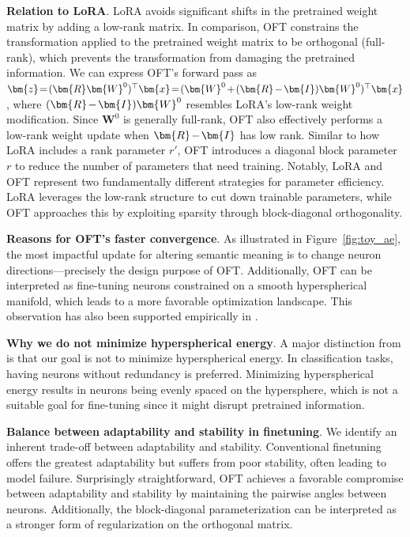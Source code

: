 \textbf{Relation to LoRA}. LoRA avoids significant shifts in the pretrained weight matrix by adding a low-rank matrix. In comparison, OFT constrains the transformation applied to the pretrained weight matrix to be orthogonal (full-rank), which prevents the transformation from damaging the pretrained information. We can express OFT's forward pass as $\thickmuskip=2mu \medmuskip=2mu \bm{z}=(\bm{R}\bm{W}^0)^\top\bm{x}=(\bm{W}^0+(\bm{R}-\bm{I})\bm{W}^0)^\top\bm{x}$, where $\thickmuskip=2mu \medmuskip=2mu (\bm{R}-\bm{I})\bm{W}^0$ resembles LoRA's low-rank weight modification. Since $\bm{W}^0$ is generally full-rank, OFT also effectively performs a low-rank weight update when $\thickmuskip=2mu \medmuskip=2mu \bm{R}-\bm{I}$ has low rank. Similar to how LoRA includes a rank parameter $r'$, OFT introduces a diagonal block parameter $r$ to reduce the number of parameters that need training. Notably, LoRA and OFT represent two fundamentally different strategies for parameter efficiency. LoRA leverages the low-rank structure to cut down trainable parameters, while OFT approaches this by exploiting sparsity through block-diagonal orthogonality.

\textbf{Reasons for OFT's faster convergence}. As illustrated in Figure~\ref{fig:toy_ae}, the most impactful update for altering semantic meaning is to change neuron directions—precisely the design purpose of OFT. Additionally, OFT can be interpreted as fine-tuning neurons constrained on a smooth hyperspherical manifold, which leads to a more favorable optimization landscape. This observation has also been supported empirically in \cite{liu2021orthogonal}.

\textbf{Why we do not minimize hyperspherical energy}. A major distinction from \cite{liu2021orthogonal} is that our goal is not to minimize hyperspherical energy. In classification tasks, having neurons without redundancy is preferred. Minimizing hyperspherical energy results in neurons being evenly spaced on the hypersphere, which is not a suitable goal for fine-tuning since it might disrupt pretrained information.

\textbf{Balance between adaptability and stability in finetuning}. We identify an inherent trade-off between adaptability and stability. Conventional finetuning offers the greatest adaptability but suffers from poor stability, often leading to model failure. Surprisingly straightforward, OFT achieves a favorable compromise between adaptability and stability by maintaining the pairwise angles between neurons. Additionally, the block-diagonal parameterization can be interpreted as a stronger form of regularization on the orthogonal matrix.

